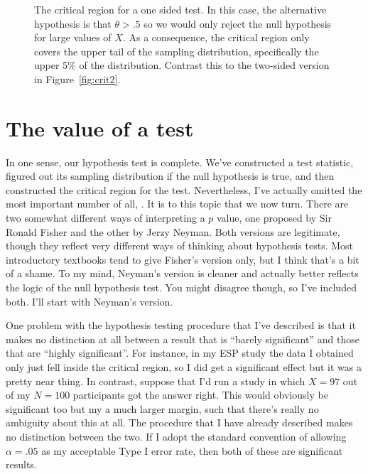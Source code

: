 \vspace{0.5cm}
\begin{figure}[t]
\begin{center}
\caption{The critical region for a one sided test. In this case, the alternative hypothesis is that $\theta > .5$ so we would only reject the null hypothesis for large values of $X$. As a consequence, the critical region only covers the upper tail of the sampling distribution, specifically the upper 5\% of the distribution. Contrast this to the two-sided version in Figure~\ref{fig:crit2}. }
\HR
\label{fig:crit1}
\end{center}
\end{figure}


\section{The \texorpdfstring{}{} value of a test~\label{sec:pvalue}}

In one sense, our hypothesis test is complete. We've constructed a test statistic, figured out its sampling distribution if the null hypothesis is true, and then constructed the critical region for the test. Nevertheless, I've actually omitted the most important number of all, . It is to this topic that we now turn. There are two somewhat different ways of interpreting a $p$ value, one proposed by Sir Ronald Fisher and the other by Jerzy Neyman. Both versions are legitimate, though they reflect very different ways of thinking about hypothesis tests. Most introductory textbooks tend to give Fisher's version only, but I think that's a bit of a shame. To my mind, Neyman's version is cleaner and actually better reflects the logic of the null hypothesis test. You might disagree though, so I've included both. I'll start with Neyman's version.


One problem with the hypothesis testing procedure that I've described is that it makes no distinction at all between a result that is ``barely significant'' and those that are ``highly significant''. For instance, in my ESP study the data I obtained only just fell inside the critical region, so I did get a significant effect but it was a pretty near thing. In contrast, suppose that I'd run a study in which $X=97$ out of my $N=100$ participants got the answer right. This would obviously be significant too but my a much larger margin, such that there's really no ambiguity about this at all. The procedure that I have already described makes no distinction between the two. If I adopt the standard convention of allowing $\alpha = .05$ as my acceptable Type I error rate, then both of these are significant results. 

